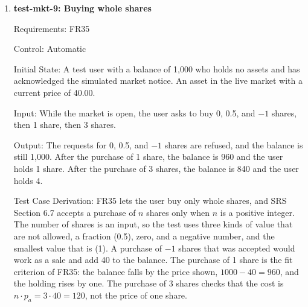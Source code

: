 \documentclass[12pt, titlepage]{article}
\begin{document}
\begin{enumerate}
Requirements: FR34

Control: Manual

Initial State: A new test account on a test device that has acknowledged the
health notice, has earned enough currency from recorded activity to buy one
share of a stock in the live market, and has not made a trade.

Input: While the US market is open, the tester tries to buy one share of the
stock.

Output: Before the trade completes, \progname{} shows a notice stating that
the market is simulated, that virtual currency and holdings have no
real-world value, and that nothing in \progname{} is financial advice. The
balance and holdings do not change until the tester acknowledges the notice,
and the purchase then completes.

Test Case Derivation: The three statements are the ones listed in the fit
criterion of FR34. test-mkt-7 checks the server's rule, and this test checks
what the user sees on a real device. The test uses the real provider, so it is
run while the US market is open, so that the trade completes instead of being
queued (FR40).

How test will be performed: The tester compares the notice's text with the
three statements, and checks the balance and holdings before and after
acknowledging it.

\item{\textbf{test-mkt-9: Buying whole shares}\\}

Requirements: FR35

Control: Automatic

Initial State: A test user with a balance of 1,000 who holds no assets and has
acknowledged the simulated market notice. An asset in the live market with a
current price of 40.00.

Input: While the market is open, the user asks to buy 0, 0.5, and $-1$
shares, then 1 share, then 3 shares.

Output: The requests for 0, 0.5, and $-1$ shares are refused, and the balance
is still 1,000. After the purchase of 1 share, the balance is 960 and the user
holds 1 share. After the purchase of 3 shares, the balance is 840 and the
user holds 4.

Test Case Derivation: FR35 lets the user buy only whole shares, and SRS
Section 6.7 accepts a purchase of $n$ shares only when $n$ is a positive
integer. The number of shares is an input, so the test uses three kinds of
value that are not allowed, a fraction (0.5), zero, and a negative number, and
the smallest value that is (1). A purchase of $-1$ shares that was accepted would
work as a sale and add 40 to the balance. The purchase of 1 share is the fit
criterion of FR35: the balance falls by the price shown, $1000 - 40 = 960$,
and the holding rises by one. The purchase of 3 shares checks that the cost is
$n \cdot p_a = 3 \cdot 40 = 120$, not the price of one share.


\end{enumerate}
\end{document}
